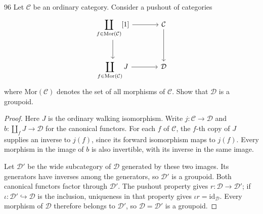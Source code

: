 \begin{exercise}{96}
Let $\mathcal C$ be an ordinary category. Consider a pushout of categories
\[
\begin{tikzcd}[column sep=large,row sep=large]
 \displaystyle\coprod_{f\in\mathrm{Mor}(\mathcal C)}[1]
   \arrow[r] \arrow[d]
   & \mathcal C \arrow[d] \\
 \displaystyle\coprod_{f\in\mathrm{Mor}(\mathcal C)}J
   \arrow[r] & \mathcal D
\end{tikzcd}
\]
where $\mathrm{Mor}(\mathcal C)$ denotes the set of all morphisms of
$\mathcal C$. Show that $\mathcal D$ is a groupoid.

\begin{proof}
Here $J$ is the ordinary walking isomorphism.
Write $j\colon\mathcal C\to\mathcal D$ and
$b\colon\coprod_f J\to\mathcal D$ for the canonical functors.
For each $f$ of $\mathcal C$, the $f$-th copy of $J$ supplies an inverse
to $j(f)$, since its forward isomorphism maps to $j(f)$.
Every morphism in the image of $b$ is also invertible, with its inverse
in the same image.

Let $\mathcal D'$ be the wide subcategory of $\mathcal D$ generated by
these two images. Its generators have inverses among the generators,
so $\mathcal D'$ is a groupoid.
Both canonical functors factor through $\mathcal D'$.
The pushout property gives $r\colon\mathcal D\to\mathcal D'$;
if $\iota\colon\mathcal D'\hookrightarrow\mathcal D$ is the inclusion,
uniqueness in that property gives $\iota r=\mathrm{id}_{\mathcal D}$.
Every morphism of $\mathcal D$ therefore belongs to $\mathcal D'$,
so $\mathcal D=\mathcal D'$ is a groupoid.
\end{proof}
\end{exercise}
